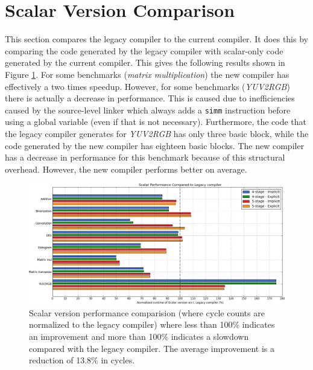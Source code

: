 \section{Scalar Version Comparison}
This section compares the legacy compiler to the current compiler. It does this by comparing the code generated by the legacy compiler with scalar-only code generated by the current compiler. This gives the following results shown in Figure \ref{fig:legacy_scalar_cmp}. For some benchmarks (\emph{matrix multiplication}) the new compiler has effectively a two times speedup. However, for some benchmarks (\emph{YUV2RGB}) there is actually a decrease in performance. This is caused due to inefficiencies caused by the source-level linker which always adds a \texttt{simm} instruction before using a global variable (even if that is not necessary). Furthermore, the code that the legacy compiler generates for \emph{YUV2RGB} has only three basic block, while the code generated by the new compiler has eighteen basic blocks. The new compiler has a decrease in performance for this benchmark because of this structural overhead. However, the new compiler performs better on average.



\begin{figure}[H]
\centering
\hspace*{-.12in}
\includegraphics[width=\textwidth]{figures/stats/scalar_cycles}
\caption{Scalar version performance comparision (where cycle counts are normalized to the legacy compiler) where less than 100\% indicates an improvement and more than 100\% indicates a slowdown compared with the legacy compiler. The average improvement is a reduction of 13.8\% in cycles.}
\label{fig:legacy_scalar_cmp}
\end{figure}


